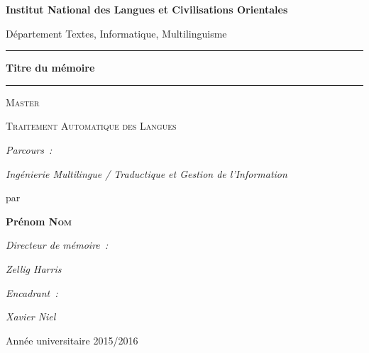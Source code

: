 \begin{center}
{\Large \textbf{Institut National des Langues et Civilisations Orientales}}


{\normalsize Département Textes, Informatique, Multilinguisme}

\hrule
{}
{\LARGE \textbf{Titre du mémoire}}
\hrule


{\Huge \textsc{Master}}


{\LARGE \textsc{Traitement Automatique des Langues}}


{\normalsize \emph{Parcours~:}}


{\normalsize \emph{Ingénierie Multilingue / Traductique et Gestion de l'Information}}


{\large par}


\textbf{{\LARGE Prénom \textsc{Nom}}}


{\normalsize \emph{Directeur de mémoire~:}}


{\normalsize \emph{Zellig Harris}}


{\normalsize \emph{Encadrant~:}}


{\normalsize \emph{Xavier Niel}}


{\normalsize Année universitaire 2015/2016}

\end{center}

\cleardoublepage %

